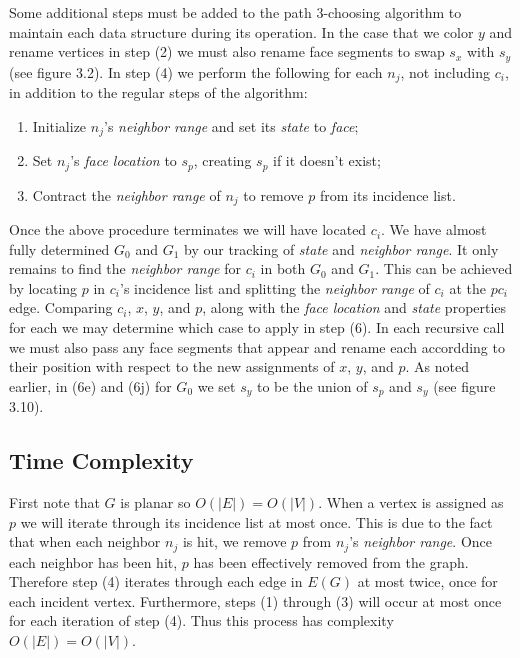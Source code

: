 \documentclass[11pt,letter]{article}
\begin{document}
\noindent Some additional steps must be added to the path $3$-choosing algorithm to maintain each data structure
during its operation. In the case that we color $y$ and rename vertices in step (2) we must also rename face
segments to swap $s_x$ with $s_y$ (see figure 3.2). In step (4) we perform
the following for each $n_j$, not including $c_i$, in addition to the regular steps of the algorithm:

\begin{enumerate}
\item Initialize $n_j$'s \emph{neighbor range} and set its \emph{state} to \emph{face};
\item Set $n_j$'s \emph{face location} to $s_p$, creating $s_p$ if it doesn't exist;
\item Contract the \emph{neighbor range} of $n_j$ to remove $p$ from its incidence list.
\end{enumerate}

\noindent Once the above procedure terminates we will have located $c_i$. We have almost fully determined $G_0$
and $G_1$ by our tracking of \emph{state} and \emph{neighbor range}. It only remains to find
the \emph{neighbor range} for $c_i$ in both $G_0$ and $G_1$. This can be achieved by locating $p$ in
$c_i$'s incidence list and splitting the \emph{neighbor range} of $c_i$ at the $pc_i$ edge. Comparing $c_i$, $x$,
$y$, and $p$, along with the \emph{face location} and \emph{state} properties for each we may determine which case
to apply in step (6). In each recursive call we must also pass any face segments that appear and rename
each accordding to their position with respect to the new assignments of $x$, $y$, and $p$. As noted earlier,
in (6e) and (6j) for $G_0$ we set $s_y$ to be the union of $s_p$ and $s_y$ (see figure 3.10).

\subsection*{Time Complexity}

First note that $G$ is planar so $O(|E|)=O(|V|)$. When a vertex is assigned as $p$ we will iterate through
its incidence list at most once. This is due to the fact that when each neighbor $n_j$ is hit, we remove $p$ from $n_j$'s
\emph{neighbor range}. Once each neighbor has been hit, $p$ has been effectively removed from the graph.
Therefore step (4) iterates through each edge in $E(G)$ at most twice, once for each incident vertex. Furthermore,
steps (1) through (3) will occur at most once for each iteration of step (4). Thus this process has complexity
$O(|E|)=O(|V|)$.\\
\end{document}

